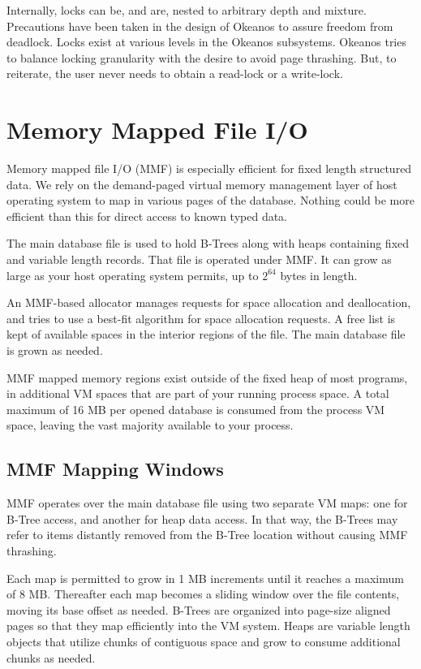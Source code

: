 \documentclass[article,oneside]{memoir}
\begin{document}
Internally, locks can be, and are, nested to arbitrary depth and mixture. Precautions have been taken in the design of Okeanos to assure freedom from deadlock. Locks exist at various levels in the Okeanos subsystems. Okeanos tries to balance locking granularity with the desire to avoid page thrashing. But, to reiterate, the user never needs to obtain a read-lock or a write-lock.

\section{Memory Mapped File I/O}
Memory mapped file I/O (MMF) is especially efficient for fixed length structured data. We rely on the demand-paged virtual memory management layer of host operating system to map in various pages of the database. Nothing could be more efficient than this for direct access to known typed data.

The main database file is used to hold B-Trees along with heaps containing fixed and variable length records. That file is operated under MMF. It can grow as large as your host operating system permits, up to $2^{64}$ bytes in length.

An MMF-based allocator manages requests for space allocation and deallocation, and tries to use a best-fit algorithm for space allocation requests. A free list is kept of available spaces in the interior regions of the file. The main database file is grown as needed.

MMF mapped memory regions exist outside of the fixed heap of most programs, in additional VM spaces that are part of your running process space. A total maximum of 16 MB per opened database is consumed from the process VM space, leaving the vast majority available to your process.

\subsection{MMF Mapping Windows}
MMF operates over the main database file using two separate VM maps:  one for B-Tree access, and another for heap data access. In that way, the B-Trees may refer to items distantly removed from the B-Tree location without causing MMF thrashing. 

Each map is permitted to grow in 1 MB increments until it reaches a maximum of 8 MB. Thereafter each map becomes a sliding window over the file contents, moving its base offset as needed. B-Trees are organized into page-size aligned pages so that they map efficiently into the VM system. Heaps are variable length objects that utilize chunks of contiguous space and grow to consume additional chunks as needed.
\end{document}
